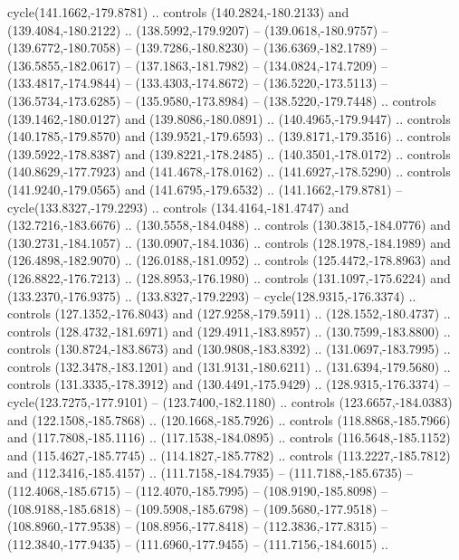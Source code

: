 \begin{scope}[cm={{1.25,0.0,0.0,-1.25,(0.0,442.91375)}}]
\begin{scope}[xscale=1.000,yscale=-1.000,fill=c545457,line join=miter,line cap=butt,line width=0.800pt]
      cycle(141.1662,-179.8781) .. controls (140.2824,-180.2133) and
      (139.4084,-180.2122) .. (138.5992,-179.9207) -- (139.0618,-180.9757) --
      (139.6772,-180.7058) -- (139.7286,-180.8230) -- (136.6369,-182.1789) --
      (136.5855,-182.0617) -- (137.1863,-181.7982) -- (134.0824,-174.7209) --
      (133.4817,-174.9844) -- (133.4303,-174.8672) -- (136.5220,-173.5113) --
      (136.5734,-173.6285) -- (135.9580,-173.8984) -- (138.5220,-179.7448) ..
      controls (139.1462,-180.0127) and (139.8086,-180.0891) .. (140.4965,-179.9447)
      .. controls (140.1785,-179.8570) and (139.9521,-179.6593) ..
      (139.8171,-179.3516) .. controls (139.5922,-178.8387) and (139.8221,-178.2485)
      .. (140.3501,-178.0172) .. controls (140.8629,-177.7923) and
      (141.4678,-178.0162) .. (141.6927,-178.5290) .. controls (141.9240,-179.0565)
      and (141.6795,-179.6532) .. (141.1662,-179.8781) -- cycle(133.8327,-179.2293)
      .. controls (134.4164,-181.4747) and (132.7216,-183.6676) ..
      (130.5558,-184.0488) .. controls (130.3815,-184.0776) and (130.2731,-184.1057)
      .. (130.0907,-184.1036) .. controls (128.1978,-184.1989) and
      (126.4898,-182.9070) .. (126.0188,-181.0952) .. controls (125.4472,-178.8963)
      and (126.8822,-176.7213) .. (128.8953,-176.1980) .. controls
      (131.1097,-175.6224) and (133.2370,-176.9375) .. (133.8327,-179.2293) --
      cycle(128.9315,-176.3374) .. controls (127.1352,-176.8043) and
      (127.9258,-179.5911) .. (128.1552,-180.4737) .. controls (128.4732,-181.6971)
      and (129.4911,-183.8957) .. (130.7599,-183.8800) .. controls
      (130.8724,-183.8673) and (130.9808,-183.8392) .. (131.0697,-183.7995) ..
      controls (132.3478,-183.1201) and (131.9131,-180.6211) .. (131.6394,-179.5680)
      .. controls (131.3335,-178.3912) and (130.4491,-175.9429) ..
      (128.9315,-176.3374) -- cycle(123.7275,-177.9101) -- (123.7400,-182.1180) ..
      controls (123.6657,-184.0383) and (122.1508,-185.7868) .. (120.1668,-185.7926)
      .. controls (118.8868,-185.7966) and (117.7808,-185.1116) ..
      (117.1538,-184.0895) .. controls (116.5648,-185.1152) and (115.4627,-185.7745)
      .. (114.1827,-185.7782) .. controls (113.2227,-185.7812) and
      (112.3416,-185.4157) .. (111.7158,-184.7935) -- (111.7188,-185.6735) --
      (112.4068,-185.6715) -- (112.4070,-185.7995) -- (108.9190,-185.8098) --
      (108.9188,-185.6818) -- (109.5908,-185.6798) -- (109.5680,-177.9518) --
      (108.8960,-177.9538) -- (108.8956,-177.8418) -- (112.3836,-177.8315) --
      (112.3840,-177.9435) -- (111.6960,-177.9455) -- (111.7156,-184.6015) ..

\end{scope}
\end{scope}
